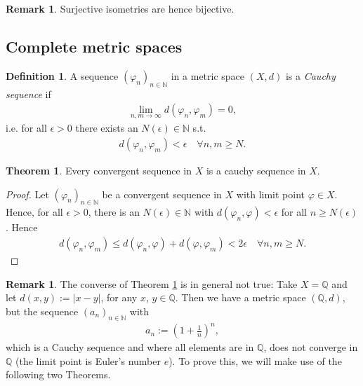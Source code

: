 \documentclass[12pt, a4paper]{article}
\numberwithin{equation}{section}
\theoremstyle{definition}
\theoremstyle{definition}
\newtheorem{defn}[thm]{Definition} %
\newtheorem{remark}[thm]{Remark} %
\newtheorem{theorem}[thm]{Theorem}
\newcommand{\abs}[1]{\left\vert #1 \right\vert}
\begin{document}
	\begin{remark}
		Surjective isometries are hence bijective.
	\end{remark}
	
	\subsection{Complete metric spaces}
	
	\begin{defn}
		A sequence $(\varphi_n)_{n\in\mathbb N}$ in a metric space $(X, d)$ is a \textit{Cauchy sequence} if 
		\begin{align}
			\lim\limits_{n, m\to\infty} d(\varphi_n, \varphi_m) = 0,
		\end{align}
		i.e. for all $\epsilon > 0$ there exists an $N(\epsilon)\in \mathbb N$ s.t. 
		\begin{align}
			d(\varphi_n, \varphi_m) < \epsilon \quad\forall n, m\geq N.
		\end{align}
	\end{defn}

	\begin{theorem}\label{thrm:convergent_sequence_cauchy_sequence}
		Every convergent sequence in $X$ is a cauchy sequence in $X$.
	\end{theorem}

	\begin{proof}
		Let $(\varphi_n)_{n\in\mathbb N}$ be a convergent sequence in $X$ with limit point $\varphi\in X$. Hence, for all $\epsilon > 0$, there is an $N(\epsilon)\in\mathbb N$ with $d(\varphi_n, \varphi) < \epsilon$ for all $n\geq N(\epsilon)$. Hence
		\begin{align}
			d(\varphi_n, \varphi_m) \leq d(\varphi_n, \varphi) + d(\varphi, \varphi_m) < 2\epsilon \quad\forall n,m\geq N.
		\end{align}
	\end{proof}

	\begin{remark}\label{remark:cauchy_not_convergent_necess}
		The converse of Theorem \ref{thrm:convergent_sequence_cauchy_sequence} is in general not true: Take $X=\mathbb Q$ and let \newline $d(x, y) := \abs{x - y}$, for any $x$, $y\in\mathbb Q$. Then we have a metric space $(\mathbb Q, d)$, but the sequence $(a_n)_{n\in\mathbb N}$ with
		\begin{align}\label{eq:seq_euler}
			a_n := \left(1 + \frac{1}{n}\right)^n,
		\end{align}
		which is a Cauchy sequence and where all elements are in $\mathbb Q$, does not converge in $\mathbb Q$ (the limit point is Euler's number $e$). To prove this, we will make use of the following two Theorems.
	\end{remark}
	
\end{document}
